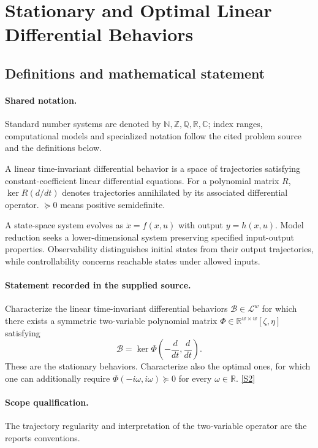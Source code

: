 \documentclass[11pt]{article}
\newcommand{\sref}[2]{\hyperlink{source:#1:#2}{[S#2]}}
\begin{document}
\section{Stationary and Optimal Linear Differential Behaviors}\label{statement}

\subsection{Definitions and mathematical statement}

\paragraph{Shared notation.}Standard number systems are denoted by $\mathbb N,\mathbb Z,\mathbb Q,\mathbb R,\mathbb C$; index ranges, computational models and specialized notation follow the cited problem source and the definitions below.


A linear time-invariant differential behavior is a space of trajectories satisfying constant-coefficient linear differential equations. For a polynomial matrix $R$, $\ker R(d/dt)$ denotes trajectories annihilated by its associated differential operator. $\succeq0$ means positive semidefinite.

A state-space system evolves as $\dot x=f(x,u)$ with output $y=h(x,u)$. Model reduction seeks a lower-dimensional system preserving specified input-output properties. Observability distinguishes initial states from their output trajectories, while controllability concerns reachable states under allowed inputs.
\paragraph{Statement recorded in the supplied source.}
Characterize the linear time-invariant differential behaviors $\mathcal{B}\in\mathcal{L}^w$ for which there exists a symmetric two-variable polynomial matrix $\Phi\in\mathbb{R}^{w\times w}[\zeta,\eta]$ satisfying $$\mathcal{B}=\ker\Phi\!\left(-\frac{d}{dt},\frac{d}{dt}\right).$$ These are the stationary behaviors. Characterize also the optimal ones, for which one can additionally require $\Phi(-i\omega,i\omega)\succeq0$ for every $\omega\in\mathbb{R}$. \sref{statement}{2}
\paragraph{Scope qualification.}
The trajectory regularity and interpretation of the two-variable operator are the report\textquotesingle s conventions.
\end{document}
